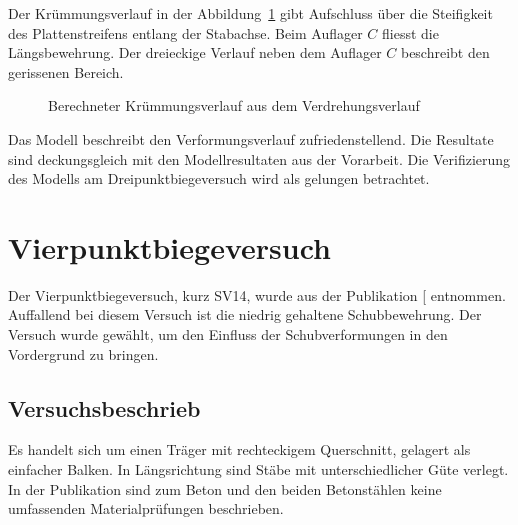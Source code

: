 \documentclass[
  11pt,
  letterpaper,
]{scrreprt}
\begin{document}
Der Krümmungsverlauf in der Abbildung~\ref{fig-chi-max-a3v2} gibt
Aufschluss über die Steifigkeit des Plattenstreifens entlang der
Stabachse. Beim Auflager \(C\) fliesst die Längsbewehrung. Der
dreieckige Verlauf neben dem Auflager \(C\) beschreibt den gerissenen
Bereich.

\begin{figure}[H]


\caption{\label{fig-chi-max-a3v2}Berechneter Krümmungsverlauf aus dem
Verdrehungsverlauf}

\end{figure}%

Das Modell beschreibt den Verformungsverlauf zufriedenstellend. Die
Resultate sind deckungsgleich mit den Modellresultaten aus der
Vorarbeit. Die Verifizierung des Modells am Dreipunktbiegeversuch wird
als gelungen betrachtet.

\newpage{}

\section{Vierpunktbiegeversuch}\label{vierpunktbiegeversuch}

Der Vierpunktbiegeversuch, kurz SV14, wurde aus der Publikation
{[}\citeproc{ref-tue_einfluss_2019}{3}{]} entnommen. Auffallend bei
diesem Versuch ist die niedrig gehaltene Schubbewehrung. Der Versuch
wurde gewählt, um den Einfluss der Schubverformungen in den Vordergrund
zu bringen.

\subsection{Versuchsbeschrieb}\label{versuchsbeschrieb-1}

Es handelt sich um einen Träger mit rechteckigem Querschnitt, gelagert
als einfacher Balken. In Längsrichtung sind Stäbe mit unterschiedlicher
Güte verlegt. In der Publikation sind zum Beton und den beiden
Betonstählen keine umfassenden Materialprüfungen beschrieben.
\end{document}
